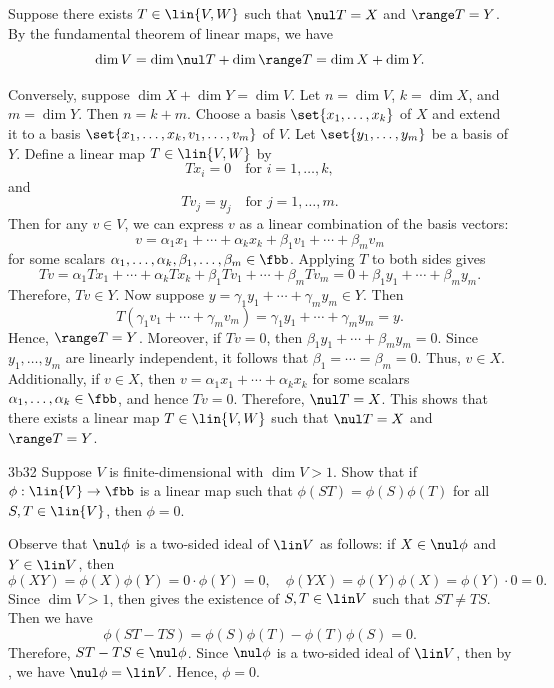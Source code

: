 \begin{sol}
    Suppose there exists $T \in \lin{V, W}$ such that $\nul T = X$ and $\range T = Y$.
	By the fundamental theorem of linear maps, we have
    \[
    	\dim V = \dim \nul T + \dim \range T = \dim X + \dim Y.
    \]

    Conversely, suppose $\dim X + \dim Y = \dim V$.
	Let $n = \dim V$, $k = \dim X$, and $m = \dim Y$.
	Then $n = k + m$.
	Choose a basis $\set{x_1, \ldots, x_k}$ of $X$ and extend it to a basis $\set{x_1, \ldots, x_k, v_1, \ldots, v_m}$ of $V$.
	Let $\set{y_1, \ldots, y_m}$ be a basis of $Y$.
	Define a linear map $T \in \lin{V, W}$ by
    \[
    	Tx_i = 0 \quad \text{for } i = 1, \ldots, k,
    \]
    and
    \[
    	Tv_j = y_j \quad \text{for } j = 1, \ldots, m.
    \]
    Then for any $v \in V$, we can express $v$ as a linear combination of the basis vectors:
    \[
    	v = \alpha_1 x_1 + \cdots + \alpha_k x_k + \beta_1 v_1 + \cdots + \beta_m v_m
    \]
    for some scalars $\alpha_1, \ldots, \alpha_k, \beta_1, \ldots, \beta_m \in \fbb$.
	Applying $T$ to both sides gives
    \[
    	Tv = \alpha_1 Tx_1 + \cdots + \alpha_k Tx_k + \beta_1 Tv_1 + \cdots + \beta_m Tv_m = 0 + \beta_1 y_1 + \cdots + \beta_m y_m.
    \]
    Therefore, $Tv \in Y$.
	Now suppose $y = \gamma_1 y_1 + \cdots + \gamma_m y_m \in Y$.
	Then
    \[
    	T(\gamma_1 v_1 + \cdots + \gamma_m v_m) = \gamma_1 y_1 + \cdots + \gamma_m y_m = y.
    \]
    Hence, $\range T = Y$.
	Moreover, if $Tv = 0$, then $\beta_1 y_1 + \cdots + \beta_m y_m = 0$.
	Since $y_1, \ldots, y_m$ are linearly independent, it follows that $\beta_1 = \cdots = \beta_m = 0$.
	Thus, $v \in X$.
	Additionally, if $v \in X$, then $v = \alpha_1 x_1 + \cdots + \alpha_k x_k$ for some scalars $\alpha_1, \ldots, \alpha_k \in \fbb$, and hence $Tv = 0$.
	Therefore, $\nul T = X$.
	This shows that there exists a linear map $T \in \lin{V, W}$ such that $\nul T = X$ and $\range T = Y$.
\end{sol}

\begin{exercise}{3b32}
    Suppose $V$ is finite-dimensional with $\dim V > 1$.
	Show that if $\phi: \lin{V} \to \fbb$ is a linear map such that $\phi(ST) = \phi(S)\phi(T)$ for all $S, T \in \lin{V}$, then $\phi = 0$.
    
\end{exercise}

\begin{sol}
    Observe that $\nul \phi$ is a two-sided ideal of $\lin V$ as follows: if $X \in \nul \phi$ and $Y \in \lin V$, then
    \[
    	\phi(XY) = \phi(X)\phi(Y) = 0 \cdot \phi(Y) = 0, \quad \phi(YX) = \phi(Y)\phi(X) = \phi(Y) \cdot 0 = 0.
    \]
    Since $\dim V > 1$, then  gives the existence of $S, T \in \lin V$ such that $ST \neq TS$.
	Then we have
    \[
    	\phi(ST - TS) = \phi(S) \phi(T) - \phi(T) \phi(S) = 0.
    \]
    Therefore, $ST - TS \in \nul \phi$.
	Since $\nul \phi$ is a two-sided ideal of $\lin V$, then by , we have $\nul \phi = \lin V$.
	Hence, $\phi = 0$.
\end{sol}

